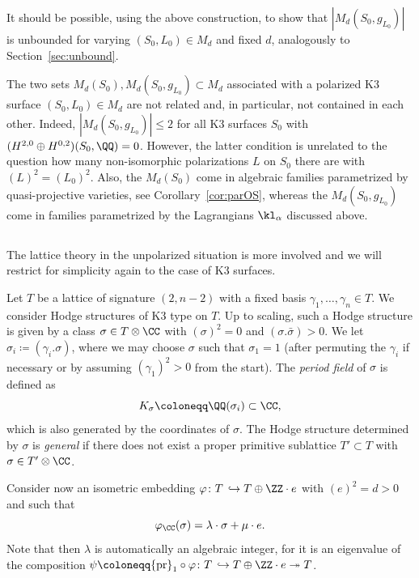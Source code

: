 It should be possible, using the above construction, to show that $|M_d(S_0,g_{L_0})|$ is unbounded for varying $(S_0,L_0)\in M_d$ and fixed $d$, analogously to Section~\ref{sec:unbound}.

\begin{rema}
The two sets $M_d(S_0),M_d(S_0,g_{L_0})\subset M_d$ associated with a polarized K3 surface $(S_0,L_0)\in M_d$ are not related and, in particular, not contained in each other. Indeed, $|M_d(S_0,g_{L_0})|\leq2$ for all K3 surfaces $S_0$ with $(H^{2,0}\oplus H^{0,2})(S_0,\QQ)=0$. However, the latter condition is unrelated to the question how many non-isomorphic polarizations $L$ on $S_0$ there are with $(L)^2=(L_0)^2$. Also, the $M_d(S_0)$ come in algebraic families parametrized by quasi-projective varieties, see Corollary~\ref{cor:parOS}, whereas the $M_d(S_0,g_{L_0})$ come in families parametrized by the Lagrangians $\kl_\alpha$ discussed above.
\end{rema}

\subsection{}\label{sec:twistorfini}
The lattice theory in the unpolarized situation is more involved and we will restrict for simplicity again to the case of K3 surfaces.

Let $T$ be a lattice of signature $(2,n-2)$ with a fixed basis $\gamma_1,\dots,\gamma_n\in T$. We consider Hodge structures of K3 type on $T$. Up to scaling, such a Hodge structure is given by a class $\sigma\in T\otimes\CC$ with $(\sigma)^2=0$ and $(\sigma.\bar\sigma)>0$. We let $\sigma_i\coloneqq (\gamma_i.\sigma)$, where we may choose $\sigma$ such that $\sigma_1=1$ (after permuting the $\gamma_i$ if necessary or by assuming $(\gamma_1)^2>0$ from the start).
The \emph{period field} of $\sigma$ is defined as
\[
K_\sigma\coloneqq\QQ(\sigma_i)\subset\CC,
\]
which is also generated by the coordinates of $\sigma$. The Hodge structure determined by $\sigma$ is \emph{general} if there does not exist a proper primitive sublattice $T'\subset T$ with $\sigma\in T'\otimes\CC$.


Consider now an isometric embedding $\varphi\colon T\,\hookrightarrow T\oplus\ZZ\cdot e$ with $(e)^2=d>0$ and such that
\begin{equation}\label{eqn:varphi}
\varphi_\CC(\sigma)=\lambda\cdot \sigma+\mu\cdot e.
\end{equation}
Note that then $\lambda$ is automatically an algebraic integer, for it is an eigenvalue of the composition $\psi\coloneqq{\rm pr}_1\circ\varphi\colon T\,\hookrightarrow T\oplus\ZZ\cdot e\twoheadrightarrow T$.



